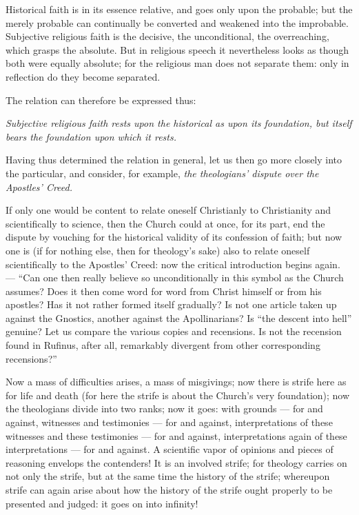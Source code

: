 \documentclass[12pt,a4paper]{book}
\begin{document}
Historical faith is in its essence relative, and goes only upon the probable;
but the merely probable can continually be converted and weakened into the
improbable. Subjective religious faith is the decisive, the unconditional, the
overreaching, which grasps the absolute. But in religious speech it nevertheless
looks as though both were equally absolute; for the religious man does not
separate them: only in reflection do they become separated.

The relation can therefore be expressed thus:

\emph{Subjective religious faith rests upon the historical as upon its
foundation, but itself bears the foundation upon which it rests.}

Having thus determined the relation in general, let us then go more closely into
the particular, and consider, for example, \emph{the theologians' dispute over
the Apostles' Creed.}

If only one would be content to relate oneself Christianly to Christianity and
scientifically to science, then the Church could at once, for its part, end the
dispute by vouching for the historical validity of its confession of faith; but
now one is (if for nothing else, then for theology's sake) also to relate
oneself scientifically to the Apostles' Creed: now the critical introduction
begins again. --- ``Can one then really believe so unconditionally in this
symbol as the Church assumes? Does it then come word for word from Christ
himself or from his apostles? Has it not rather formed itself gradually? Is not
one article taken up against the Gnostics, another against the Apollinarians? Is
``the descent into hell'' genuine? Let us compare the various copies and
recensions. Is not the recension found in Rufinus, after all, remarkably
divergent from other corresponding recensions?''

Now a mass of difficulties arises, a mass of misgivings; now there is strife
here as for life and death (for here the strife is about the Church's very
foundation); now the theologians divide into two ranks; now it goes: with
grounds --- for and against, witnesses and testimonies --- for and against,
interpretations of these witnesses and these testimonies --- for and against,
interpretations again of these interpretations --- for and against. A scientific
vapor of opinions and pieces of reasoning envelops the contenders! It is an
involved strife; for theology carries on not only the strife, but at the same
time the history of the strife; whereupon strife can again arise about how the
history of the strife ought properly to be presented and judged: it goes on
into infinity!
\end{document}

